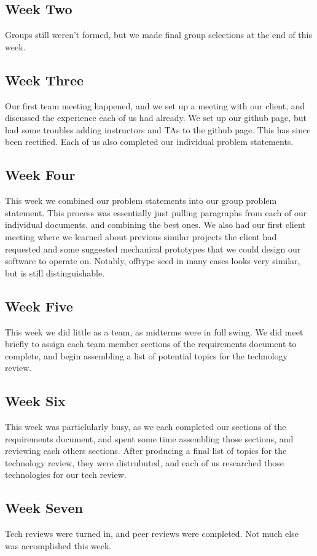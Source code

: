 \documentclass[onecolumn, draftclsnofoot,10pt, compsoc]{IEEEtran}
\begin{document}
\subsection{Week Two}
Groups still weren't formed, but we made final group selections at the end of this week.
\subsection{Week Three}
Our first team meeting happened, and we set up a meeting with our client, and discussed the experience each of us had already. We set up our github page, but had some troubles adding instructors and TAs to the github page. This has since been rectified.
Each of us also completed our individual problem statements.
\subsection{Week Four}
This week we combined our problem statements into our group problem statement. This process was essentially just pulling paragraphs from each of our individual documents, and combining the best ones.
We also had our first client meeting where we learned about previous similar projects the client had requested and some suggested mechanical prototypes that we could design our software to operate on. Notably, offtype seed in many cases looks very similar, but is still distinguishable.
\subsection{Week Five}
This week we did little as a team, as midterms were in full swing. We did meet briefly to assign each team member sections of the requirements document to complete, and begin assembling a list of potential topics for the technology review. 
\subsection{Week Six}
This week was particlularly busy, as we each completed our sections of the requirements document, and spent some time assembling those sections, and reviewing each others sections. After producing a final list of topics for the technology review, they were distrubuted, and each of us researched those technologies for our tech review.
\subsection{Week Seven}
Tech reviews were turned in, and peer reviews were completed. Not much else was accomplished this week.
\end{document}
